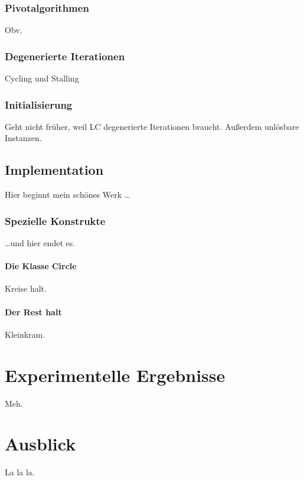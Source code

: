 \documentclass[a4paper,twoside,ngerman]{report}
\theoremstyle{plain}
\theoremstyle{definition}
\begin{document}
\subsection{Pivotalgorithmen}\label{pivot}
Obv.

\subsection{Degenerierte Iterationen}\label{deg}
Cycling und Stalling

\subsection{Initialisierung} \label{init}
Geht nicht früher, weil LC degenerierte Iterationen braucht.
Außerdem unlösbare Instanzen.

\section{Implementation} \label{prog}
Hier beginnt mein schönes Werk \ldots

\subsection{Spezielle Konstrukte}
\ldots und hier endet es.

\subsubsection{Die Klasse Circle}
Kreise halt.\cite{NSAbook}

\subsubsection{Der Rest halt}
Kleinkram.

\newpage
\chapter{Experimentelle Ergebnisse}
Meh.

\newpage
\chapter{Ausblick}
La la la.

{}

\end{document}
